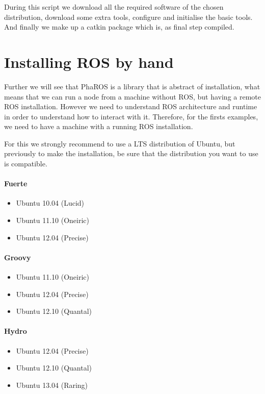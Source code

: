 \documentclass[a4paper,10pt,twoside]{book}
\begin{document}
\begin{lstlisting}[language=bash,title={\installationTool{} Installing Hydro in Ubuntu: Raring - Output}]
				\end{lstlisting}
				
				
				During this script we download all the required software of the chosen distribution, download some extra tools,  configure and initialise the basic tools. And finally we make up a catkin package which is, as final step compiled.
				
				
			
			
			
			
			\section{Installing ROS by hand}
				Further we will see that PhaROS is a library that is abstract of installation, what means that we can run a node from a machine without ROS, but having a remote ROS installation. However we need to understand ROS architecture and runtime in order to understand how to interact with it. Therefore, for the firsts examples, we need to have a machine with a running ROS installation. 
				
				For this we strongly recommend to use a LTS distribution of Ubuntu, but previously to make the installation, be sure that the distribution you want to use is compatible. 
				
				\paragraph{Fuerte}  
						\begin{itemize}
							\item Ubuntu 10.04 (Lucid)
							\item Ubuntu 11.10 (Oneiric)
							\item Ubuntu 12.04 (Precise)
						\end{itemize}

				\paragraph{Groovy}  
						\begin{itemize}
							\item Ubuntu 11.10 (Oneiric)
							\item Ubuntu 12.04 (Precise)
							\item Ubuntu 12.10 (Quantal)
						\end{itemize}
				\paragraph{Hydro}  
						\begin{itemize}
							\item Ubuntu 12.04 (Precise)
							\item Ubuntu 12.10 (Quantal)
							\item Ubuntu 13.04 (Raring)
						\end{itemize}
				
\end{document}
